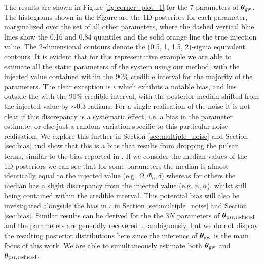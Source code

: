\documentclass[fleqn,usenatbib,useAMS]{mnras}
\begin{document}
 The results are shown in Figure \ref{fig:corner_plot_1} for the 7 parameters of  $\boldsymbol{\theta}_{\rm gw}$. The histograms shown in the Figure are the 1D-posteriors for each parameter, marginalized over the set of all other parameters, where the dashed vertical blue lines show the 0.16 and 0.84 quantiles and the solid orange line the true injection value. The 2-dimensional contours denote the (0.5, 1, 1.5, 2)-sigma equivalent contours. It is evident that for this representative example we are able to estimate all the static parameters of the system using our method, with the injected value contained within the 90\% credible interval for the majority of the parameters. The clear exception is $\iota$ which exhibits a notable bias, and lies outside the with the 90\% credible interval, with the posterior median shifted from the injected value by $\sim 0.3$ radians. For a single realisation of the noise it is not clear if this discrepancy is a systematic effect, i.e. a bias in the parameter estimate, or else just a random variation specific to this particular noise realisation. We explore this further in Section \ref{sec:multiple_noise} and Section \ref{sec:bias} and show that this is a bias that results from dropping the pulsar terms, similar to the bias reported in \cite{Zhupulsarterms}. If we consider the median values of the 1D-posteriors we can see that for some parameters the median is almost identically equal to the injected value  (e.g. $\Omega, \Phi_0, \delta$) whereas for others the median has a slight discrepancy from the injected value (e.g. $\psi, \alpha$), whilst still being contained within the credible interval. This potential bias will also be investigated alongside the bias in $\iota$ in Section \ref{sec:multiple_noise} and Section \ref{sec:bias}. Similar results can be derived for the the 3$N$ parameters of $\boldsymbol{\theta}_{\rm psr, reduced}$ and the parameters are generally recovered unambiguously, but we do not display the resulting posterior distributions here since the inference of $\boldsymbol{\theta}_{\rm gw}$ is the main focus of this work. We are able to simultaneously estimate both $\boldsymbol{\theta}_{\rm gw}$ and $\boldsymbol{\theta}_{\rm psr, reduced}$. 
 

% 
 
\end{document}
